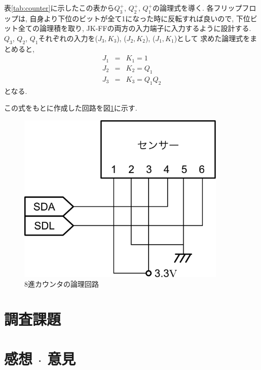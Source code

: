\documentclass[titlepage]{jsarticle}
\begin{document}
    表\ref{tab:counter}に示したこの表から$Q_3^+$, $Q_2^+$, $Q_1^+$の論理式を導く.
    各フリップフロップは, 自身より下位のビットが全て1になった時に反転すれば良いので,
    下位ビット全ての論理積を取り, JK-FFの両方の入力端子に入力するように設計する.
    $Q_3$, $Q_2$, $Q_1$それぞれの入力を($J_3, K_3$), ($J_2, K_2$), ($J_1, K_1$)として
    求めた論理式をまとめると,
    \begin{eqnarray*}
      J_1 &=& K_1 = 1 \\
      J_2 &=& K_2 = Q_1 \\
      J_3 &=& K_3 = Q_1Q_2
    \end{eqnarray*}
    となる.

    この式をもとに作成した回路を図\ref{fig:counter}に示す.
    \begin{figure}[h]
      \centering
      \includegraphics[width=10cm]{images/haisen.pdf}
      \caption{8進カウンタの論理回路}
      \label{fig:counter}
    \end{figure}
\section{調査課題}

\section{感想 $\cdot$ 意見}
\end{document}
